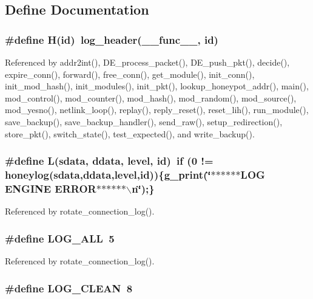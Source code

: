 \subsection{Define Documentation}
\subsubsection[{H}]{\setlength{\rightskip}{0pt plus 5cm}\#define H(id)~log\_\-header(\_\-\_\-func\_\-\_\-, id)}\label{log_8h_ee722791bac86c287527610799a9d221}




Referenced by addr2int(), DE\_\-process\_\-packet(), DE\_\-push\_\-pkt(), decide(), expire\_\-conn(), forward(), free\_\-conn(), get\_\-module(), init\_\-conn(), init\_\-mod\_\-hash(), init\_\-modules(), init\_\-pkt(), lookup\_\-honeypot\_\-addr(), main(), mod\_\-control(), mod\_\-counter(), mod\_\-hash(), mod\_\-random(), mod\_\-source(), mod\_\-yesno(), netlink\_\-loop(), replay(), reply\_\-reset(), reset\_\-lih(), run\_\-module(), save\_\-backup(), save\_\-backup\_\-handler(), send\_\-raw(), setup\_\-redirection(), store\_\-pkt(), switch\_\-state(), test\_\-expected(), and write\_\-backup().
\subsubsection[{L}]{\setlength{\rightskip}{0pt plus 5cm}\#define L(sdata, \/  ddata, \/  level, \/  id)~if (0 != honeylog(sdata,ddata,level,id))\{g\_\-print(\char`\"{}$\ast$$\ast$$\ast$$\ast$$\ast$$\ast$LOG ENGINE ERROR$\ast$$\ast$$\ast$$\ast$$\ast$$\ast$$\backslash$n\char`\"{});\}}\label{log_8h_01f7abe12dee0dec71077c7da26234d7}




Referenced by rotate\_\-connection\_\-log().
\subsubsection[{LOG\_\-ALL}]{\setlength{\rightskip}{0pt plus 5cm}\#define LOG\_\-ALL~5}\label{log_8h_7574ce4aa047de1f4a564c9b441e69dc}




Referenced by rotate\_\-connection\_\-log().
\subsubsection[{LOG\_\-CLEAN}]{\setlength{\rightskip}{0pt plus 5cm}\#define LOG\_\-CLEAN~8}\label{log_8h_73f9ed7c8838eafbefa1d8963168f304}


